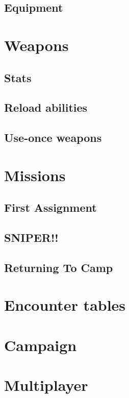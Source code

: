 \documentclass[twocolumn,titlepage]{article}
\begin{document}
\subsection{Equipment}
\section{Weapons}
\subsection{Stats}
\subsection{Reload abilities}
\subsection{Use-once weapons}
\section{Missions}
\subsection{First Assignment}
\subsection{SNIPER!!}
\subsection{Returning To Camp}
\section{Encounter tables}
\section{Campaign}
\section{Multiplayer}
\end{document}
